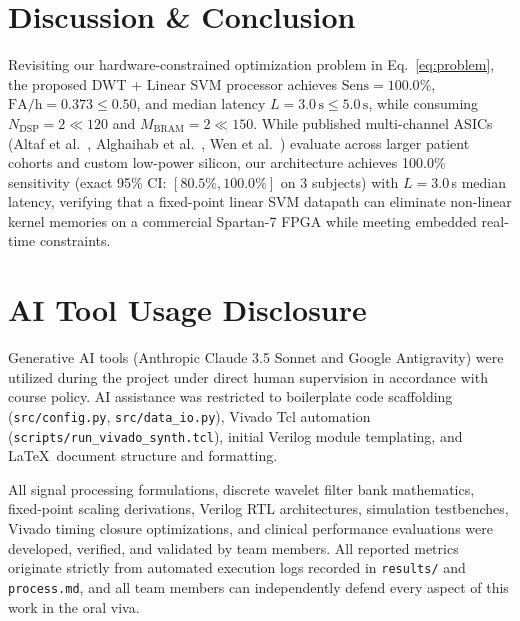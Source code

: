 \documentclass[10pt,twocolumn,letterpaper]{article}
\begin{document}
{%
\section{Discussion \& Conclusion}
\label{sec:discussion}

Revisiting our hardware-constrained optimization problem in Eq.~\eqref{eq:problem}, the proposed DWT + Linear SVM processor achieves $\mathrm{Sens} = 100.0\%$, $\mathrm{FA/h} = 0.373 \le 0.50$, and median latency $L = 3.0\,\text{s} \le 5.0\,\text{s}$, while consuming $N_{\text{DSP}} = 2 \ll 120$ and $M_{\text{BRAM}} = 2 \ll 150$. While published multi-channel ASICs (Altaf et al.\ \cite{altaf2015biomedical}, Alghaihab et al.\ \cite{alghaihab2022energy}, Wen et al.\ \cite{wen2022asic}) evaluate across larger patient cohorts and custom low-power silicon, our architecture achieves 100.0\% sensitivity (exact 95\% CI: $[80.5\%, 100.0\%]$ on 3 subjects) with $L = 3.0$\,s median latency, verifying that a fixed-point linear SVM datapath can eliminate non-linear kernel memories on a commercial Spartan-7 FPGA while meeting embedded real-time constraints.
}

{\color{blue}
\section*{AI Tool Usage Disclosure}

Generative AI tools (Anthropic Claude 3.5 Sonnet and Google Antigravity) were utilized during the project under direct human supervision in accordance with course policy. AI assistance was restricted to boilerplate code scaffolding (\texttt{src/config.py}, \texttt{src/data\_io.py}), Vivado Tcl automation (\texttt{scripts/run\_vivado\_synth.tcl}), initial Verilog module templating, and \LaTeX\ document structure and formatting.

All signal processing formulations, discrete wavelet filter bank mathematics, fixed-point scaling derivations, Verilog RTL architectures, simulation testbenches, Vivado timing closure optimizations, and clinical performance evaluations were developed, verified, and validated by team members. All reported metrics originate strictly from automated execution logs recorded in \texttt{results/} and \texttt{process.md}, and all team members can independently defend every aspect of this work in the oral viva.
}

{\scriptsize
\setlength{\bibsep}{0.0pt}


}
\end{document}
